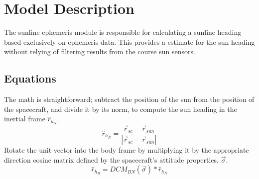 
\section{Model Description}

The sunline ephemeris module is responsible for calculating a sunline heading based exclusively on ephemeris data. This provides a estimate for the sun heading without relying of filtering results from the course sun sensors. 

\subsection{Equations}
The math is straightforward; subtract the position of the sun from the position of the spacecraft, and divide it by its norm, to compute the sun heading in the inertial frame $\hat{r}_{h_N}$. 
\begin{equation}
	\hat{r}_{h_N} = \frac{\vec{r}_{sc} - \vec{r}_{sun}}{|\vec{r}_{sc} - \vec{r}_{sun}|}
\end{equation}
Rotate the unit vector into the body frame by multiplying it by the appropriate direction cosine matrix defined by the spacecraft's attitude properties, $\vec{\sigma}$. 
\begin{equation}
	\hat{r}_{h_B} = DCM_{BN}(\vec{\sigma})*\hat{r}_{h_N}
\end{equation}

